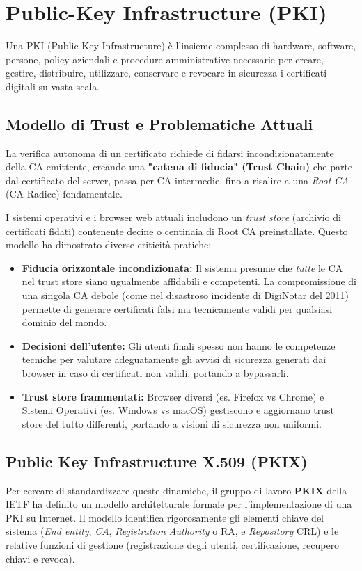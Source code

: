\section{Public-Key Infrastructure (PKI)}

Una PKI (Public-Key Infrastructure) è l'insieme complesso di hardware, software, persone, policy aziendali e procedure amministrative necessarie per creare, gestire, distribuire, utilizzare, conservare e revocare in sicurezza i certificati digitali su vasta scala.

\subsection{Modello di Trust e Problematiche Attuali}
La verifica autonoma di un certificato richiede di fidarsi incondizionatamente della CA emittente, creando una \textbf{"catena di fiducia" (Trust Chain)} che parte dal certificato del server, passa per CA intermedie, fino a risalire a una \textit{Root CA} (CA Radice) fondamentale. 

I sistemi operativi e i browser web attuali includono un \textit{trust store} (archivio di certificati fidati) contenente decine o centinaia di Root CA preinstallate. Questo modello ha dimostrato diverse criticità pratiche:
\begin{warnbox}
\begin{itemize}
    \item \textbf{Fiducia orizzontale incondizionata:} Il sistema presume che \textit{tutte} le CA nel trust store siano ugualmente affidabili e competenti. La compromissione di una singola CA debole (come nel disastroso incidente di DigiNotar del 2011) permette di generare certificati falsi ma tecnicamente validi per qualsiasi dominio del mondo.
    \item \textbf{Decisioni dell'utente:} Gli utenti finali spesso non hanno le competenze tecniche per valutare adeguatamente gli avvisi di sicurezza generati dai browser in caso di certificati non validi, portando a bypassarli.
    \item \textbf{Trust store frammentati:} Browser diversi (es. Firefox vs Chrome) e Sistemi Operativi (es. Windows vs macOS) gestiscono e aggiornano trust store del tutto differenti, portando a visioni di sicurezza non uniformi.
\end{itemize}
\end{warnbox}

\subsection{Public Key Infrastructure X.509 (PKIX)}
Per cercare di standardizzare queste dinamiche, il gruppo di lavoro \textbf{PKIX} della IETF ha definito un modello architetturale formale per l'implementazione di una PKI su Internet. Il modello identifica rigorosamente gli elementi chiave del sistema (\textit{End entity}, \textit{CA}, \textit{Registration Authority} o RA, e \textit{Repository} CRL) e le relative funzioni di gestione (registrazione degli utenti, certificazione, recupero chiavi e revoca).
